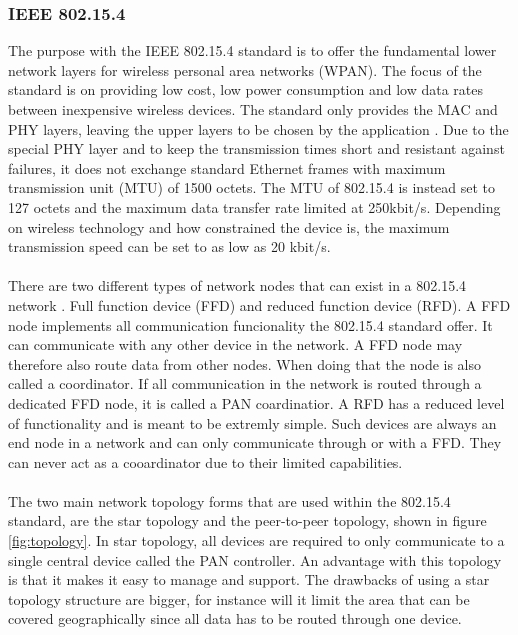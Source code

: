 \subsubsection{IEEE 802.15.4}
The purpose with the IEEE 802.15.4 standard is to offer the fundamental lower network layers for wireless personal area networks (WPAN). The focus of the standard is on providing low cost, low power consumption and low data rates between inexpensive wireless devices. 
The standard only provides the MAC and PHY layers, leaving the upper layers to be chosen by the application \cite{6185525} \cite{radio-electronic-802-15-4}. Due to the special PHY layer and to keep the transmission times short and resistant against failures, it does not exchange standard Ethernet frames with maximum transmission unit (MTU) of 1500 octets. The MTU of 802.15.4 is instead set to 127 octets and the maximum data transfer rate limited at 250kbit/s. Depending on wireless technology and how constrained the device is, the maximum transmission speed can be set to as low as 20 kbit/s.
\\\\
There are two different types of network nodes that can exist in a 802.15.4 network \cite{radio-electronic-802-15-4}. Full function device (FFD) and reduced function device (RFD). A FFD node implements all communication funcionality the 802.15.4 standard offer. It can communicate with any other device in the network. A FFD node may therefore also route data from other nodes. When doing that the node is also called a coordinator. If all communication in the network is routed through a dedicated FFD node, it is called a PAN coardinatior. A RFD has a reduced level of functionality and is meant to be extremly simple. Such devices are always an end node in a network and can only communicate through or with a FFD. They can never act as a cooardinator due to their limited capabilities.
\\\\
The two main network topology forms that are used within the 802.15.4 standard, are the star topology and the peer-to-peer topology, shown in figure \ref{fig:topology}. In star topology, all devices are required to only communicate to a single central device called the PAN controller. An advantage with this topology is that it makes it easy to manage and support. The drawbacks of using a star topology structure are bigger, for instance will it limit the area that can be covered geographically since all data has to be routed through one device.\\\\
